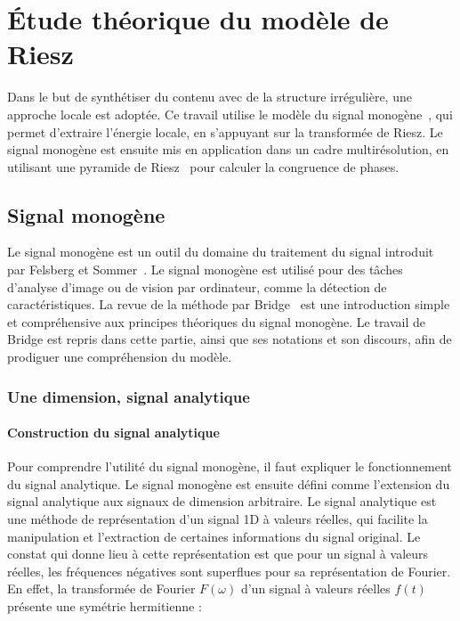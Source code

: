 \chapter[Modèle de Riesz]{Étude théorique du modèle de Riesz} %
\label{chap:chapitre1}

Dans le but de synthétiser du contenu avec de la structure irrégulière, une approche locale est adoptée. Ce travail utilise le modèle du signal monogène~\cite{felsberg_monogenic_2001}, qui permet d'extraire l'énergie locale, en s'appuyant sur la transformée de Riesz. Le signal monogène est ensuite mis en application dans un cadre multirésolution, en utilisant une pyramide de Riesz~\cite{wadhwa_riesz_2014} pour calculer la congruence de phases.

\section{Signal monogène}

Le signal monogène est un outil du domaine du traitement du signal introduit par Felsberg et Sommer~\cite{felsberg_monogenic_2001}. Le signal monogène est utilisé pour des tâches d'analyse d'image ou de vision par ordinateur, comme la détection de caractéristiques. La revue de la méthode par Bridge~\cite{bridge_introduction_2018} est une introduction simple et compréhensive aux principes théoriques du signal monogène. Le travail de Bridge est repris dans cette partie, ainsi que ses notations et son discours, afin de prodiguer une compréhension du modèle.

\subsection{Une dimension, signal analytique}

\subsubsection{Construction du signal analytique}

Pour comprendre l'utilité du signal monogène, il faut expliquer le fonctionnement du signal analytique. Le signal monogène est ensuite défini comme l'extension du signal analytique aux signaux de dimension arbitraire. Le signal analytique est une méthode de représentation d'un signal 1D à valeurs réelles, qui facilite la manipulation et l'extraction de certaines informations du signal original. Le constat qui donne lieu à cette représentation est que pour un signal à valeurs réelles, les fréquences négatives sont superflues pour sa représentation de Fourier. En effet, la transformée de Fourier $F(\omega)$ d'un signal à valeurs réelles $f(t)$ présente une symétrie hermitienne :

